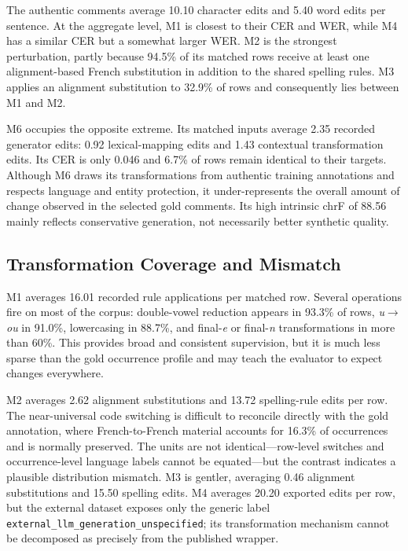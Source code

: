\documentclass[12pt, a4paper, twoside, openany]{report}
\begin{document}
The authentic comments average 10.10 character edits and 5.40 word edits per sentence. At the aggregate level, M1 is closest to their CER and WER, while M4 has a similar CER but a somewhat larger WER. M2 is the strongest perturbation, partly because 94.5\% of its matched rows receive at least one alignment-based French substitution in addition to the shared spelling rules. M3 applies an alignment substitution to 32.9\% of rows and consequently lies between M1 and M2.

M6 occupies the opposite extreme. Its matched inputs average 2.35 recorded generator edits: 0.92 lexical-mapping edits and 1.43 contextual transformation edits. Its CER is only 0.046 and 6.7\% of rows remain identical to their targets. Although M6 draws its transformations from authentic training annotations and respects language and entity protection, it under-represents the overall amount of change observed in the selected gold comments. Its high intrinsic chrF of 88.56 mainly reflects conservative generation, not necessarily better synthetic quality.

\subsection{Transformation Coverage and Mismatch}

M1 averages 16.01 recorded rule applications per matched row. Several operations fire on most of the corpus: double-vowel reduction appears in 93.3\% of rows, \textit{u}$\rightarrow$\textit{ou} in 91.0\%, lowercasing in 88.7\%, and final-\textit{e} or final-\textit{n} transformations in more than 60\%. This provides broad and consistent supervision, but it is much less sparse than the gold occurrence profile and may teach the evaluator to expect changes everywhere.

M2 averages 2.62 alignment substitutions and 13.72 spelling-rule edits per row. The near-universal code switching is difficult to reconcile directly with the gold annotation, where French-to-French material accounts for 16.3\% of occurrences and is normally preserved. The units are not identical---row-level switches and occurrence-level language labels cannot be equated---but the contrast indicates a plausible distribution mismatch. M3 is gentler, averaging 0.46 alignment substitutions and 15.50 spelling edits. M4 averages 20.20 exported edits per row, but the external dataset exposes only the generic label \texttt{external\_llm\_generation\_unspecified}; its transformation mechanism cannot be decomposed as precisely from the published wrapper.
\end{document}
